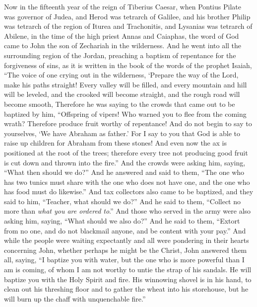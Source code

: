 \begin{biblechapter} %
 Now in the fifteenth year of the reign of Tiberius Caesar, when Pontius Pilate was governor of Judea, and Herod was tetrarch of Galilee, and his brother Philip was tetrarch of the region of Iturea and Trachonitis, and Lysanias was tetrarch of Abilene,
\verse in the time of the high priest Annas and Caiaphas, the word of God came to John the son of Zechariah in the wilderness.
\verse And he went into all the surrounding region of the Jordan, preaching a baptism of repentance for the forgiveness of sins,
\verse as it is written in the book of the words of the prophet Isaiah,
\verse “The voice of one crying out in the wilderness, 
‘Prepare the way of the Lord, 
make his paths straight!
\verse Every valley will be filled, 
and every mountain and hill will be leveled, 
and the crooked will become straight, 
and the rough road will become smooth,
\verse Therefore he was saying to the crowds that came out to be baptized by him, “Offspring of vipers! Who warned you to flee from the coming wrath?
\verse Therefore produce fruit worthy of repentance! And do not begin to say to yourselves, ‘We have Abraham as father.’ For I say to you that God is able to raise up children for Abraham from these stones!
\verse And even now the ax is positioned at the root of the trees; therefore every tree not producing good fruit is cut down and thrown into the fire.”
\verse And the crowds were asking him, saying, “What then should we do?”
\verse And he answered and said to them, “The one who has two tunics must share with the one who does not have one, and the one who has food must do likewise.”
\verse And tax collectors also came to be baptized, and they said to him, “Teacher, what should we do?”
\verse And he said to them, “Collect no more than \textit{what you are ordered to}.”
\verse And those who served in the army were also asking him, saying, “What should we also do?” And he said to them, “Extort from no one, and do not blackmail anyone, and be content with your pay.”
\verse And while the people were waiting expectantly and all were pondering in their hearts concerning John, whether perhaps he might be the Christ,
\verse John answered them all, saying, “I baptize you with water, but the one who is more powerful than I am is coming, of whom I am not worthy to untie the strap of his sandals. He will baptize you with the Holy Spirit and fire.
\verse His winnowing shovel is in his hand, to clean out his threshing floor and to gather the wheat into his storehouse, but he will burn up the chaff with unquenchable fire.”

\end{biblechapter}
